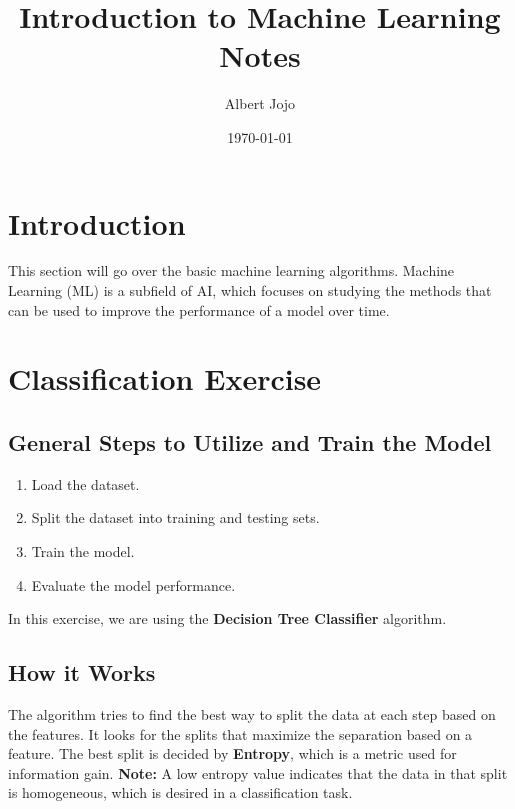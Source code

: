\documentclass{article}
\title{Introduction to Machine Learning Notes}
\author{Albert Jojo}
\date{\today}
\begin{document}
\maketitle

\section{Introduction}
This section will go over the basic machine learning algorithms.
Machine Learning (ML) is a subfield of AI, which focuses on studying the methods that can be used to improve the 
performance of a model over time.

\section{Classification Exercise}
\subsection{General Steps to Utilize and Train the Model}
\begin{enumerate}
    \item Load the dataset.
    \item Split the dataset into training and testing sets.
    \item Train the model.
    \item Evaluate the model performance.
\end{enumerate}
In this exercise, we are using the \textbf{Decision Tree Classifier} algorithm.

\subsection{How it Works}
The algorithm tries to find the best way to split the data at each step based on the features.
It looks for the splits that maximize the separation based on a feature. The best split is decided by
\textbf{Entropy}, which is a metric used for information gain. \textbf{Note:} A low entropy value indicates that the data
in that split is homogeneous, which is desired in a classification task.

\begin{center}
\end{center}
\end{document}
